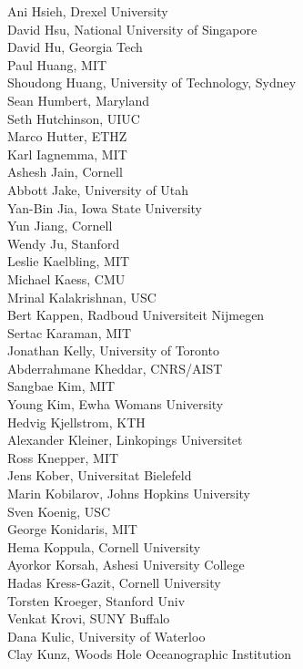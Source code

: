 \begin{multicols}{3}
{Ani Hsieh, Drexel University\\
David Hsu, National University of Singapore\\
David Hu, Georgia Tech\\
Paul Huang, MIT\\
Shoudong Huang, University of Technology, Sydney\\
Sean Humbert, Maryland\\
Seth Hutchinson, UIUC\\
Marco Hutter, ETHZ\\
Karl Iagnemma, MIT\\
Ashesh Jain, Cornell\\
Abbott Jake, University of Utah\\
Yan-Bin Jia, Iowa State University\\
Yun Jiang, Cornell\\
Wendy Ju, Stanford\\
Leslie Kaelbling, MIT\\
Michael Kaess, CMU\\
Mrinal Kalakrishnan, USC\\
Bert Kappen, Radboud Universiteit Nijmegen\\
Sertac Karaman, MIT\\
Jonathan Kelly, University of Toronto\\
Abderrahmane Kheddar, CNRS/AIST\\
Sangbae Kim, MIT\\
Young Kim, Ewha Womans University\\
Hedvig Kjellstrom, KTH\\
Alexander Kleiner, Linkopings Universitet\\
Ross Knepper, MIT\\
Jens Kober, Universitat Bielefeld\\
Marin Kobilarov, Johns Hopkins University\\
Sven Koenig, USC\\
George Konidaris, MIT\\
Hema Koppula, Cornell University\\
Ayorkor Korsah, Ashesi University College\\
Hadas Kress-Gazit, Cornell University\\
Torsten Kroeger, Stanford Univ\\
Venkat Krovi, SUNY Buffalo\\
Dana Kulic, University of Waterloo\\
Clay Kunz, Woods Hole Oceanographic Institution\\
}
\end{multicols}
